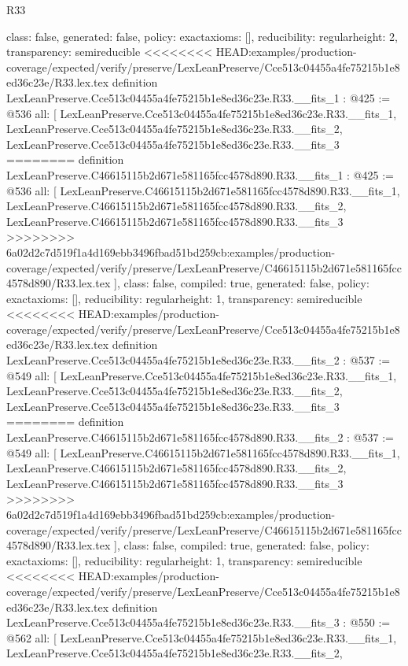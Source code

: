 \begin{lexlean}{R33}
\begin{coremodule}
{{{{{{{{{  class: false,
  generated: false,
  policy: exact{axioms: []},
  reducibility: regular{height: 2},
  transparency: semireducible
}
<<<<<<<< HEAD:examples/production-coverage/expected/verify/preserve/LexLeanPreserve/Cce513c04455a4fe75215b1e8ed36c23e/R33.lex.tex
definition LexLeanPreserve.Cce513c04455a4fe75215b1e8ed36c23e.R33.__fits_1 : @425 := @536 {
  all: [
    LexLeanPreserve.Cce513c04455a4fe75215b1e8ed36c23e.R33.__fits_1,
    LexLeanPreserve.Cce513c04455a4fe75215b1e8ed36c23e.R33.__fits_2,
    LexLeanPreserve.Cce513c04455a4fe75215b1e8ed36c23e.R33.__fits_3
========
definition LexLeanPreserve.C46615115b2d671e581165fcc4578d890.R33.__fits_1 : @425 := @536 {
  all: [
    LexLeanPreserve.C46615115b2d671e581165fcc4578d890.R33.__fits_1,
    LexLeanPreserve.C46615115b2d671e581165fcc4578d890.R33.__fits_2,
    LexLeanPreserve.C46615115b2d671e581165fcc4578d890.R33.__fits_3
>>>>>>>> 6a02d2c7d519f1a4d169ebb3496fbad51bd259cb:examples/production-coverage/expected/verify/preserve/LexLeanPreserve/C46615115b2d671e581165fcc4578d890/R33.lex.tex
  ],
  class: false,
  compiled: true,
  generated: false,
  policy: exact{axioms: []},
  reducibility: regular{height: 1},
  transparency: semireducible
}
<<<<<<<< HEAD:examples/production-coverage/expected/verify/preserve/LexLeanPreserve/Cce513c04455a4fe75215b1e8ed36c23e/R33.lex.tex
definition LexLeanPreserve.Cce513c04455a4fe75215b1e8ed36c23e.R33.__fits_2 : @537 := @549 {
  all: [
    LexLeanPreserve.Cce513c04455a4fe75215b1e8ed36c23e.R33.__fits_1,
    LexLeanPreserve.Cce513c04455a4fe75215b1e8ed36c23e.R33.__fits_2,
    LexLeanPreserve.Cce513c04455a4fe75215b1e8ed36c23e.R33.__fits_3
========
definition LexLeanPreserve.C46615115b2d671e581165fcc4578d890.R33.__fits_2 : @537 := @549 {
  all: [
    LexLeanPreserve.C46615115b2d671e581165fcc4578d890.R33.__fits_1,
    LexLeanPreserve.C46615115b2d671e581165fcc4578d890.R33.__fits_2,
    LexLeanPreserve.C46615115b2d671e581165fcc4578d890.R33.__fits_3
>>>>>>>> 6a02d2c7d519f1a4d169ebb3496fbad51bd259cb:examples/production-coverage/expected/verify/preserve/LexLeanPreserve/C46615115b2d671e581165fcc4578d890/R33.lex.tex
  ],
  class: false,
  compiled: true,
  generated: false,
  policy: exact{axioms: []},
  reducibility: regular{height: 1},
  transparency: semireducible
}
<<<<<<<< HEAD:examples/production-coverage/expected/verify/preserve/LexLeanPreserve/Cce513c04455a4fe75215b1e8ed36c23e/R33.lex.tex
definition LexLeanPreserve.Cce513c04455a4fe75215b1e8ed36c23e.R33.__fits_3 : @550 := @562 {
  all: [
    LexLeanPreserve.Cce513c04455a4fe75215b1e8ed36c23e.R33.__fits_1,
    LexLeanPreserve.Cce513c04455a4fe75215b1e8ed36c23e.R33.__fits_2,
}}}}}}}}}}}
\end{coremodule}
\end{lexlean}
